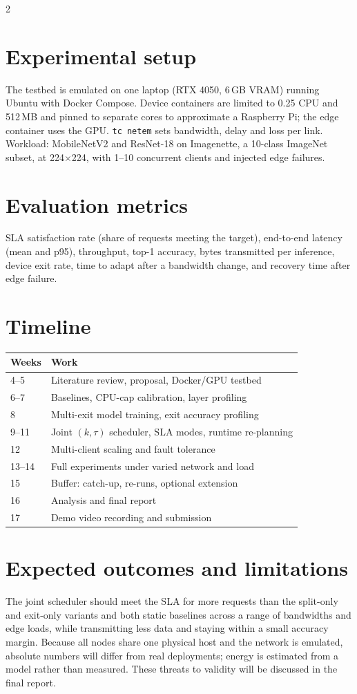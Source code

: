 \documentclass[10pt,a4paper]{article}
\begin{document}
\begin{multicols}{2}
\section{Experimental setup}
The testbed is emulated on one laptop (RTX 4050, 6\,GB VRAM) running Ubuntu with Docker Compose. Device containers are limited to 0.25 CPU and 512\,MB and pinned to separate cores to approximate a Raspberry Pi; the edge container uses the GPU. \texttt{tc netem} sets bandwidth, delay and loss per link. Workload: MobileNetV2 and ResNet-18 on Imagenette, a 10-class ImageNet subset, at 224$\times$224, with 1--10 concurrent clients and injected edge failures.

\section{Evaluation metrics}
SLA satisfaction rate (share of requests meeting the target), end-to-end latency (mean and p95), throughput, top-1 accuracy, bytes transmitted per inference, device exit rate, time to adapt after a bandwidth change, and recovery time after edge failure.

\section{Timeline}
{\small
\begin{tabularx}{\columnwidth}{@{}l X@{}}
\toprule
\textbf{Weeks} & \textbf{Work} \\
\midrule
4--5   & Literature review, proposal, Docker/GPU testbed \\
6--7   & Baselines, CPU-cap calibration, layer profiling \\
8      & Multi-exit model training, exit accuracy profiling \\
9--11  & Joint $(k,\tau)$ scheduler, SLA modes, runtime re-planning \\
12     & Multi-client scaling and fault tolerance \\
13--14 & Full experiments under varied network and load \\
15     & Buffer: catch-up, re-runs, optional extension \\
16     & Analysis and final report \\
17     & Demo video recording and submission \\
\bottomrule
\end{tabularx}}

\section{Expected outcomes and limitations}
The joint scheduler should meet the SLA for more requests than the split-only and exit-only variants and both static baselines across a range of bandwidths and edge loads, while transmitting less data and staying within a small accuracy margin. Because all nodes share one physical host and the network is emulated, absolute numbers will differ from real deployments; energy is estimated from a model rather than measured. These threats to validity will be discussed in the final report.

\end{multicols}
\end{document}
